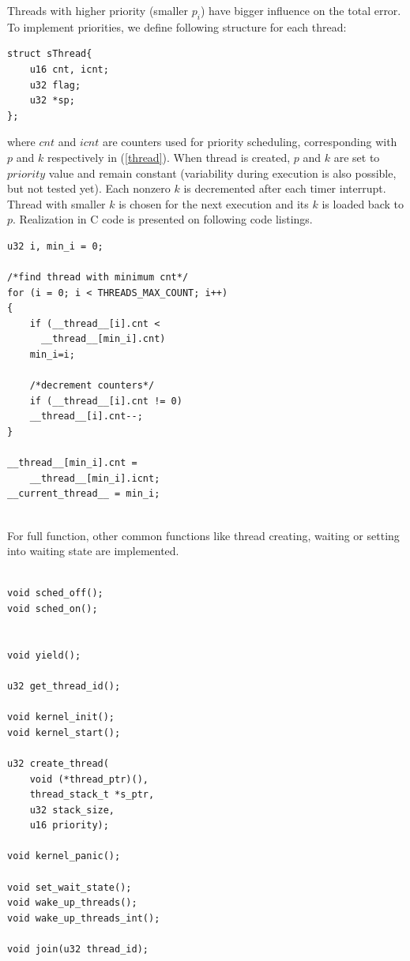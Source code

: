 \documentclass[a4paper, conference]{IEEEtran}
\begin{document}
Threads with higher priority (smaller $p_i$) have bigger influence on the total error. To implement priorities, we define following structure for each thread:
\noindent\begin{minipage}{.45\textwidth}
\lstset{language=C++}
\begin{lstlisting}[frame=single, caption = thread structure]
struct sThread{
    u16 cnt, icnt;
    u32 flag;
    u32 *sp;
};
\end{lstlisting}
\end{minipage}\hfill
where $cnt$ and $icnt$ are counters used for priority scheduling, corresponding with $p$ and $k$ respectively in (\ref{thread}).
When thread is created, $p$ and $k$ are set to $priority$ value and remain constant (variability during execution is also possible, but not tested yet).
Each nonzero $k$ is decremented after each timer interrupt. Thread with smaller $k$ is chosen for the next execution and its $k$ is loaded back to $p$.
Realization in C code is presented on following code listings.
\noindent
\begin{minipage}{.45\textwidth}
\lstset{language=C++}
\begin{lstlisting}[frame=single, caption = priority scheduler]
u32 i, min_i = 0;

/*find thread with minimum cnt*/
for (i = 0; i < THREADS_MAX_COUNT; i++)
{
    if (__thread__[i].cnt <
      __thread__[min_i].cnt)
	min_i=i;

    /*decrement counters*/
    if (__thread__[i].cnt != 0)
	__thread__[i].cnt--;
}

__thread__[min_i].cnt =
	__thread__[min_i].icnt;
__current_thread__ = min_i;
\end{lstlisting}
\end{minipage}
\\
For full function, other common functions like thread creating, waiting or setting into waiting state are implemented.
\noindent\begin{minipage}{.45\textwidth}
\lstset{language=C++}
\begin{lstlisting}[frame=single, caption = kernel functions]

void sched_off();
void sched_on();


void yield();

u32 get_thread_id();

void kernel_init();
void kernel_start();

u32 create_thread(
    void (*thread_ptr)(),
    thread_stack_t *s_ptr,
    u32 stack_size,
    u16 priority);

void kernel_panic();

void set_wait_state();
void wake_up_threads();
void wake_up_threads_int();

void join(u32 thread_id);

\end{lstlisting}
\end{minipage}\hfill
\end{document}
